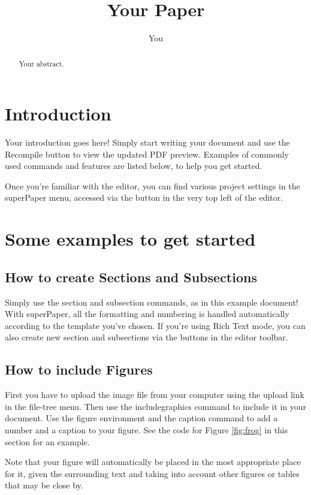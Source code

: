 \documentclass{article}
\title{Your Paper}
\author{You}
\begin{document}
\maketitle

\begin{abstract}
Your abstract.
\end{abstract}

\section{Introduction}

Your introduction goes here! Simply start writing your document and use the Recompile button to view the updated PDF preview. Examples of commonly used commands and features are listed below, to help you get started.

Once you're familiar with the editor, you can find various project settings in the superPaper menu, accessed via the button in the very top left of the editor.

\section{Some examples to get started}

\subsection{How to create Sections and Subsections}

Simply use the section and subsection commands, as in this example document! With superPaper, all the formatting and numbering is handled automatically according to the template you've chosen. If you're using Rich Text mode, you can also create new section and subsections via the buttons in the editor toolbar.

\subsection{How to include Figures}

First you have to upload the image file from your computer using the upload link in the file-tree menu. Then use the includegraphics command to include it in your document. Use the figure environment and the caption command to add a number and a caption to your figure. See the code for Figure \ref{fig:frog} in this section for an example.

Note that your figure will automatically be placed in the most appropriate place for it, given the surrounding text and taking into account other figures or tables that may be close by.
\end{document}
